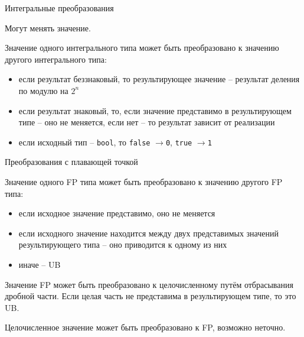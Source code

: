 \documentclass[unknownkeysallowed,xcolor=table]{beamer}
\newcommand{\rarr}{$\rightarrow$}
\begin{document}
\begin{frame}{Интегральные преобразования}

Могут менять значение.
\vspace{1.5em}

Значение одного интегрального типа может быть преобразовано к значению другого интегрального типа:

\vspace{1em}
\begin{itemize}
  \item если результат беззнаковый, то результирующее значение -- результат деления по модулю на $2^n$ \vspace{0.5em}
  \item если результат знаковый, то, если значение представимо в результирующем типе -- оно не меняется, если нет -- то результат зависит от реализации \vspace{0.5em}
  \item если исходный тип -- \lstinline{bool}, то \lstinline{false} \rarr \lstinline{0}, \lstinline{true} \rarr \lstinline{1}
\end{itemize}

\end{frame}

\begin {frame}{Преобразования с плавающей точкой}

Значение одного FP типа может быть преобразовано к значению другого FP типа:

\begin{itemize}
  \item если исходное значение представимо, оно не меняется
  \item если исходного значение находится между двух представимых значений результирующего типа -- оно приводится к одному из них
  \item иначе -- UB
\end{itemize}
\vspace{0.5em}

Значение FP может быть преобразовано к целочисленному путём отбрасывания дробной части. Если целая часть не представима в результирующем типе, то это UB.
\vspace{1em}

Целочисленное значение может быть преобразовано к FP, возможно неточно.

\end{frame}
\end{document}

